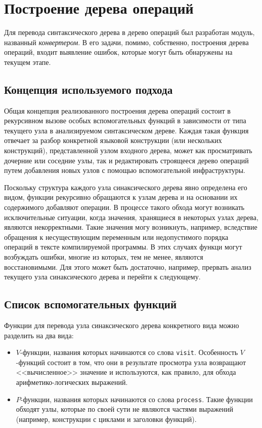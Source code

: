 \newpage
\section{Построение дерева операций}
\label{sec:converter}

Для перевода синтаксического дерева в дерево операций был разработан модуль, названный \textit{конвертером}.
В его задачи, помимо, собственно, построения дерева операций, входит выявление ошибок, которые могут быть обнаружены на текущем этапе.

\subsection{Концепция используемого подхода}
\label{sec:converter_concept}

Общая концепция реализованного построения дерева операций состоит в рекурсивном вызове особых вспомогательных функций в зависимости от типа текущего узла в анализируемом синтаксическом дереве.
Каждая такая функция отвечает за разбор конкретной языковой конструкции (или нескольких конструкций), представленной узлом входного дерева, может как просматривать дочерние или соседние узлы, так и редактировать строящееся дерево операций путем добавления новых узлов с помощью вспомогательной инфраструктуры.

Поскольку структура каждого узла синаксического дерева явно определена его видом, функции рекурсивно обращаются к узлам дерева и на основании их содержимого добавляют операции.
В процессе такого обхода могут возникать исключительные ситуации, когда значения, хранящиеся в некоторых узлах дерева, являются некорректными.
Такие значения могу возникнуть, например, вследствие обращения к несуществующим переменным или недопустимого порядка операций в тексте компилируемой программы.
В этих случаях функци могут возбуждать ошибки, многие из которых, тем не менее, являются восстановимыми.
Для этого может быть достаточно, например, прервать анализ текущего узла синаксического дерева и перейти к следующему.

\subsection{Список вспомогательных функций}
\label{sec:converter_functions}

Функции для перевода узла синаксического дерева конкретного вида можно разделить на два вида:

\begin{itemize}
    \item \(V\)-функции, названия которых начинаются со слова \verb|visit|.
          Особенность \(V\)-функций состоит в том, что они в результате просмотра узла возвращают <<вычисленное>> значение и используются, как правило, для обхода арифметико-логических выражений.
    \item \(P\)-функции, названия которых начинаются со слова \verb|process|.
          Такие функции обходят узлы, которые по своей сути не являются частями выражений (например, конструкции с циклами и заголовки функций).
\end{itemize}

